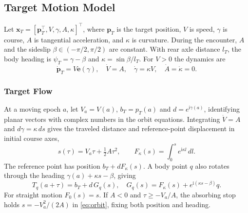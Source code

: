 \documentclass[journal]{IEEEtran}
\theoremstyle{definition}
\newcommand{\vct}[1]{\boldsymbol{#1}}
\begin{document}
\subsection{Target Motion Model}
Let $\vct x_T=[\vct p_T^\top,V,\gamma,A,\kappa]^\top$, where
$\vct p_T$ is the target position, $V$ is speed, $\gamma$ is course,
$A$ is tangential acceleration, and $\kappa$ is curvature. During the
encounter, $A$ and the sideslip $\beta\in(-\pi/2,\pi/2)$ are constant.
With rear axle distance $l_T$, the body heading is $\psi_T=\gamma-\beta$
and $\kappa=\sin\beta/l_T$. For $V>0$ the dynamics are
\begin{equation}\label{eq:target}
 \dot{\vct p}_T=V\vct e(\gamma),\quad
 \dot V=A,\quad \dot\gamma=\kappa V,\quad \dot A=\dot\kappa=0.
\end{equation}

\subsubsection{Target Flow}
At a moving epoch $a$, let $V_a=V(a)$, $b_T=p_T(a)$ and
$d=e^{\mathrm i\gamma(a)}$, identifying planar vectors with complex
numbers in the orbit equations. Integrating $\dot V=A$ and
$d\gamma=\kappa\,ds$ gives the traveled distance and reference-point
displacement in initial course axes,
\begin{equation}\label{eq:clock}
 s(\tau)=V_a\tau+\tfrac12 A\tau^2,\qquad
 F_\kappa(s)=\int_0^s e^{\mathrm i\kappa l}\,dl .
\end{equation}
The reference point has position $b_T+dF_\kappa(s)$. A body point $q$
also rotates through the heading $\gamma(a)+\kappa s-\beta$, giving
\begin{equation}\label{eq:orbit}
 T_q(a+\tau)=b_T+d\,G_q(s),\quad
 G_q(s)=F_\kappa(s)+e^{\mathrm i(\kappa s-\beta)}q .
\end{equation}
For straight motion $F_0(s)=s$. If $A<0$ and $\tau\ge -V_a/A$, the
absorbing stop holds $s=-V_a^2/(2A)$ in \eqref{eq:orbit}, fixing both
position and heading.
\end{document}
